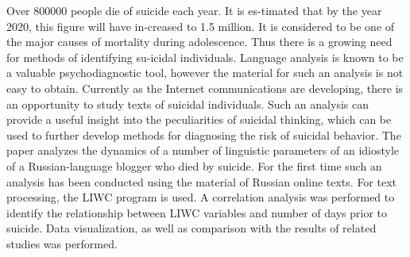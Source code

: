 Over 800000 people die of suicide each year. It is es-timated that by the year 2020, this figure will have in-creased to 1.5 million. It is considered to be one of the major causes of mortality during adolescence. Thus there is a growing need for methods of identifying su-icidal individuals. Language analysis is known to be a valuable psychodiagnostic tool, however the material for such an analysis is not easy to obtain. Currently as the Internet communications are developing, there is an opportunity to study texts of suicidal individuals. Such an analysis can provide a useful insight into the peculiarities of suicidal thinking, which can be used to further develop methods for diagnosing the risk of suicidal behavior. The paper analyzes the dynamics of a number of linguistic parameters of an idiostyle of a Russian-language blogger who died by suicide. For the first time such an analysis has been conducted using the material of Russian online texts. For text processing, the LIWC program is used. A correlation analysis was performed to identify the relationship between LIWC variables and number of days prior to suicide. Data visualization, as well as comparison with the results of related studies was performed.
